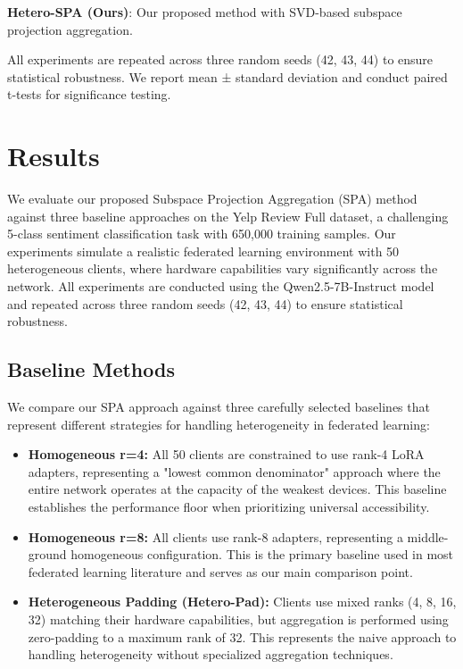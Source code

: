 \documentclass[conference]{IEEEtran}
\begin{document}
\textbf{Hetero-SPA (Ours)}: Our proposed method with SVD-based subspace projection aggregation.

All experiments are repeated across three random seeds (42, 43, 44) to ensure statistical robustness. We report mean ± standard deviation and conduct paired t-tests for significance testing.

\section{Results}
\label{sec:results}

We evaluate our proposed Subspace Projection Aggregation (SPA) method against three baseline approaches on the Yelp Review Full dataset, a challenging 5-class sentiment classification task with 650,000 training samples. Our experiments simulate a realistic federated learning environment with 50 heterogeneous clients, where hardware capabilities vary significantly across the network. All experiments are conducted using the Qwen2.5-7B-Instruct model and repeated across three random seeds (42, 43, 44) to ensure statistical robustness.

\subsection{Baseline Methods}

We compare our SPA approach against three carefully selected baselines that represent different strategies for handling heterogeneity in federated learning:

\begin{itemize}
    \item \textbf{Homogeneous r=4:} All 50 clients are constrained to use rank-4 LoRA adapters, representing a "lowest common denominator" approach where the entire network operates at the capacity of the weakest devices. This baseline establishes the performance floor when prioritizing universal accessibility.
    
    \item \textbf{Homogeneous r=8:} All clients use rank-8 adapters, representing a middle-ground homogeneous configuration. This is the primary baseline used in most federated learning literature and serves as our main comparison point.
    
    \item \textbf{Heterogeneous Padding (Hetero-Pad):} Clients use mixed ranks (4, 8, 16, 32) matching their hardware capabilities, but aggregation is performed using zero-padding to a maximum rank of 32. This represents the naive approach to handling heterogeneity without specialized aggregation techniques.
\end{itemize}
\end{document}
